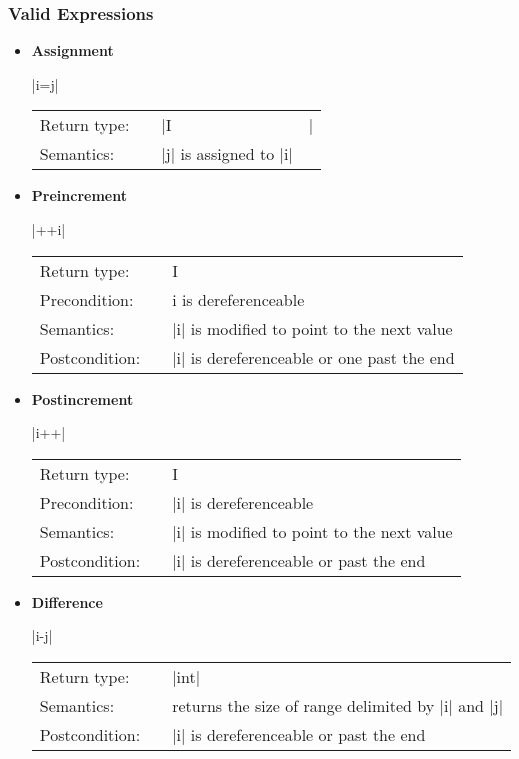 \documentclass[12pt,twoside]{report}
\begin{document}
\subsubsection*{Valid Expressions}
\begin{itemize}

  \item {\bf Assignment}
    
    |i=j|
    
    \begin{tabular}[!h]{l p{1cm} p{10cm}}
      Return type: & & |I&| \\
      Semantics: & & |j| is assigned to |i|\\
    \end{tabular}
  
\item {\bf Preincrement}

  |++i|

  \begin{tabular}[!h]{l p{1cm} p{10cm}}
    Return type: & & I\\
    Precondition: & & i is dereferenceable\\
    Semantics: & & |i| is modified to point to the next value\\
    Postcondition: & & |i| is dereferenceable or one past the end\\
  \end{tabular}


\item {\bf Postincrement}

  |i++|

  \begin{tabular}[!h]{l p{1cm} p{10cm}}
    Return type: & & I\\
    Precondition: & & |i| is dereferenceable\\
    Semantics: & & |i| is modified to point to the next value\\
    Postcondition: & & |i| is dereferenceable or past the end\\
  \end{tabular}


\item {\bf Difference}

  |i-j|

  \begin{tabular}[!h]{l p{1cm} p{10cm}}
    Return type: & & |int|\\
    Semantics: & & returns the size of range delimited by |i| and |j|\\
    Postcondition: & & |i| is dereferenceable or past the end\\
  \end{tabular}



\end{itemize}
\end{document}
